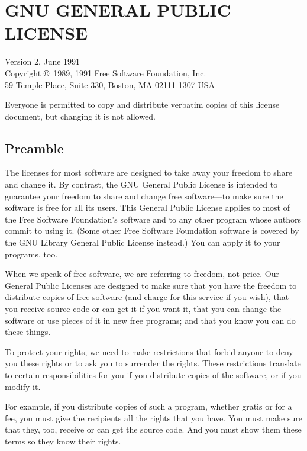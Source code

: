 \documentclass[a4paper]{report}
\begin{document}
\chapter*{GNU GENERAL PUBLIC LICENSE}

Version 2, June 1991\\

\noindent
 Copyright \copyright\ 1989, 1991 Free Software Foundation, Inc.\\
     59 Temple Place, Suite 330, Boston, MA  02111-1307  USA

\noindent
 Everyone is permitted to copy and distribute verbatim copies
 of this license document, but changing it is not allowed.


\section*{Preamble}

The licenses for most software are designed to take away your freedom to
share and change it.  By contrast, the GNU General Public License is intended
to guarantee your freedom to share and change free software---to make sure
the software is free for all its users.  This General Public License applies
to most of the Free Software Foundation's software and to any other program
whose authors commit to using it.  (Some other Free Software Foundation
software is covered by the GNU Library General Public License instead.)  You
can apply it to your programs, too.

When we speak of free software, we are referring to freedom, not price.  Our
General Public Licenses are designed to make sure that you have the freedom
to distribute copies of free software (and charge for this service if you
wish), that you receive source code or can get it if you want it, that you
can change the software or use pieces of it in new free programs; and that
you know you can do these things.

To protect your rights, we need to make restrictions that forbid anyone to
deny you these rights or to ask you to surrender the rights.  These
restrictions translate to certain responsibilities for you if you distribute
copies of the software, or if you modify it.

For example, if you distribute copies of such a program, whether gratis or
for a fee, you must give the recipients all the rights that you have.  You
must make sure that they, too, receive or can get the source code.  And you
must show them these terms so they know their rights.
\end{document}
